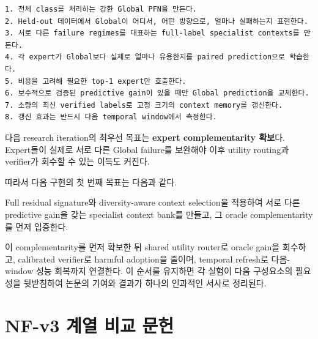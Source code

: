 \begin{Verbatim}[breaklines=true,breakanywhere=true,fontsize=\scriptsize]
1. 전체 class를 처리하는 강한 Global PFN을 만든다.
2. Held-out 데이터에서 Global이 어디서, 어떤 방향으로, 얼마나 실패하는지 표현한다.
3. 서로 다른 failure regimes를 대표하는 full-label specialist contexts를 만든다.
4. 각 expert가 Global보다 실제로 얼마나 유용한지를 paired prediction으로 학습한다.
5. 비용을 고려해 필요한 top-1 expert만 호출한다.
6. 보수적으로 검증된 predictive gain이 있을 때만 Global prediction을 교체한다.
7. 소량의 최신 verified labels로 고정 크기의 context memory를 갱신한다.
8. 갱신 효과는 반드시 다음 temporal window에서 측정한다.

\end{Verbatim}
다음 research iteration의 최우선 목표는 \textbf{expert complementarity 확보}다. Expert들이 실제로 서로 다른 Global failure를 보완해야 이후 utility routing과 verifier가 회수할 수 있는 이득도 커진다.

따라서 다음 구현의 첫 번째 목표는 다음과 같다.

Full residual signature와 diversity-aware context selection을 적용하여 서로 다른 predictive gain을 갖는 specialist context bank를 만들고, 그 oracle complementarity를 먼저 입증한다.



이 complementarity를 먼저 확보한 뒤 shared utility router로 oracle gain을 회수하고, calibrated verifier로 harmful adoption을 줄이며, temporal refresh로 다음-window 성능 회복까지 연결한다. 이 순서를 유지하면 각 실험이 다음 구성요소의 필요성을 뒷받침하여 논문의 기여와 결과가 하나의 인과적인 서사로 정리된다.



\section{NF-v3 계열 비교 문헌}


